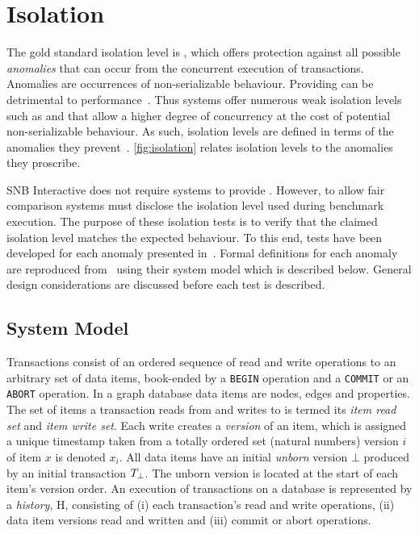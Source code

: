 \section{Isolation}
\label{sec:isolation}

The gold standard isolation level is , which offers protection against all possible \emph{anomalies} that can occur from the concurrent execution of transactions.
Anomalies are occurrences of non-serializable behaviour.
Providing  can be detrimental to performance~\cite{DBLP:conf/ds/GrayLPT76}.
Thus systems offer numerous weak isolation levels such as  and  that allow a higher degree of concurrency at the cost of potential non-serializable behaviour.
As such, isolation levels are defined in terms of the anomalies they prevent~\cite{DBLP:conf/ds/GrayLPT76,DBLP:journals/pvldb/BailisDFGHS13}.
\autoref{fig:isolation} relates isolation levels to the anomalies they proscribe.

SNB Interactive does not require systems to provide .
However, to allow fair comparison systems must disclose the isolation level used during benchmark execution.
The purpose of these isolation tests is to verify that the claimed isolation level matches the expected behaviour.
To this end, tests have been developed for each anomaly presented in~\cite{DBLP:journals/tods/BailisFGHS16}.
Formal definitions for each anomaly are reproduced from~\cite{adya1999weak,DBLP:journals/tods/BailisFGHS16} using their system model which is described below.
General design considerations are discussed before each test is described.

\subsection{System Model}
\label{sec:system-model}

Transactions consist of an ordered sequence of read and write operations to an arbitrary set of data items, book-ended by a \texttt{BEGIN} operation and a \texttt{COMMIT} or an \texttt{ABORT} operation.
In a graph database data items are nodes, edges and properties.
The set of items a transaction reads from and writes to is termed its \emph{item read set} and \emph{item write set}.
Each write creates a \emph{version} of an item, which is assigned a unique timestamp taken from a totally ordered set (\eg natural numbers) version $i$ of item $x$ is denoted $x_i$.
All data items have an initial \emph{unborn} version $\bot$ produced by an initial transaction $T_{\bot}$.
The unborn version is located at the start of each item's version order.
An execution of transactions on a database is represented by a \emph{history}, H, consisting of (i) each transaction's read and write operations, (ii) data item versions read and written and (iii) commit or abort operations.

